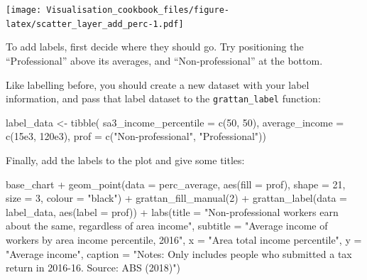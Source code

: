 \documentclass[
]{book}
\newenvironment{Shaded}{\begin{snugshade}}{\end{snugshade}}
\newcommand{\AttributeTok}[1]{\textcolor[rgb]{0.77,0.63,0.00}{#1}}
\newcommand{\DecValTok}[1]{\textcolor[rgb]{0.00,0.00,0.81}{#1}}
\newcommand{\FloatTok}[1]{\textcolor[rgb]{0.00,0.00,0.81}{#1}}
\newcommand{\FunctionTok}[1]{\textcolor[rgb]{0.00,0.00,0.00}{#1}}
\newcommand{\NormalTok}[1]{#1}
\newcommand{\OtherTok}[1]{\textcolor[rgb]{0.56,0.35,0.01}{#1}}
\newcommand{\SpecialCharTok}[1]{\textcolor[rgb]{0.00,0.00,0.00}{#1}}
\newcommand{\StringTok}[1]{\textcolor[rgb]{0.31,0.60,0.02}{#1}}
\begin{document}
\texttt{[image: Visualisation\_cookbook\_files/figure-latex/scatter\_layer\_add\_perc-1.pdf]}

To add labels, first decide where they should go. Try positioning the ``Professional'' above its averages, and ``Non-professional'' at the bottom.

Like labelling before, you should create a new dataset with your label information, and pass that label dataset to the \texttt{grattan\_label} function:

\begin{Shaded}
\begin{Highlighting}[]
\NormalTok{label\_data }\OtherTok{\textless{}{-}} \FunctionTok{tibble}\NormalTok{(}
  \AttributeTok{sa3\_income\_percentile =} \FunctionTok{c}\NormalTok{(}\DecValTok{50}\NormalTok{, }\DecValTok{50}\NormalTok{),}
  \AttributeTok{average\_income =} \FunctionTok{c}\NormalTok{(}\FloatTok{15e3}\NormalTok{, }\FloatTok{120e3}\NormalTok{),}
  \AttributeTok{prof =}  \FunctionTok{c}\NormalTok{(}\StringTok{"Non{-}professional"}\NormalTok{, }\StringTok{"Professional"}\NormalTok{))}
\end{Highlighting}
\end{Shaded}

Finally, add the labels to the plot and give some titles:

\begin{Shaded}
\begin{Highlighting}[]
\NormalTok{base\_chart }\SpecialCharTok{+}
  \FunctionTok{geom\_point}\NormalTok{(}\AttributeTok{data =}\NormalTok{ perc\_average,}
             \FunctionTok{aes}\NormalTok{(}\AttributeTok{fill =}\NormalTok{ prof),}
             \AttributeTok{shape =} \DecValTok{21}\NormalTok{,}
             \AttributeTok{size =} \DecValTok{3}\NormalTok{, }
             \AttributeTok{colour =} \StringTok{"black"}\NormalTok{) }\SpecialCharTok{+} 
  \FunctionTok{grattan\_fill\_manual}\NormalTok{(}\DecValTok{2}\NormalTok{) }\SpecialCharTok{+} 
  \FunctionTok{grattan\_label}\NormalTok{(}\AttributeTok{data =}\NormalTok{ label\_data,}
                \FunctionTok{aes}\NormalTok{(}\AttributeTok{label =}\NormalTok{ prof)) }\SpecialCharTok{+} 
  \FunctionTok{labs}\NormalTok{(}\AttributeTok{title =} \StringTok{"Non{-}professional workers earn about the same, regardless of area income"}\NormalTok{,}
       \AttributeTok{subtitle =} \StringTok{"Average income of workers by area income percentile, 2016"}\NormalTok{,}
       \AttributeTok{x =} \StringTok{"Area total income percentile"}\NormalTok{,}
       \AttributeTok{y =} \StringTok{"Average income"}\NormalTok{,}
       \AttributeTok{caption =} \StringTok{"Notes: Only includes people who submitted a tax return in 2016{-}16. Source: ABS (2018)"}\NormalTok{)}
\end{Highlighting}
\end{Shaded}
\end{document}
